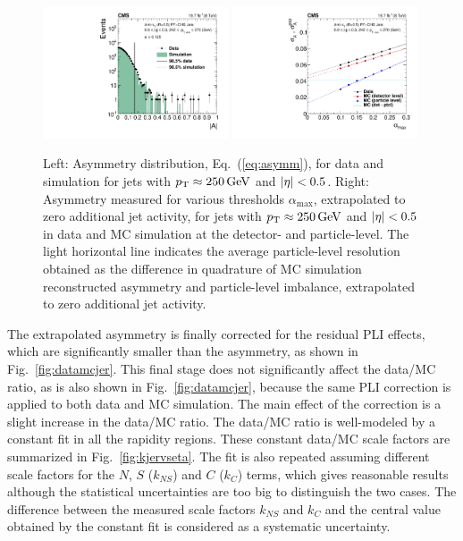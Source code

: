 \documentclass[11pt,twoside,a4paper,cmspaper,final,collab]{cms-tdr}
\begin{document}
\begin{figure}[htbp!]
\centering
\includegraphics[width=0.49\textwidth]{Figure_039-a.pdf}
\includegraphics[width=0.49\textwidth]{Figure_039-b.pdf}
\caption{\label{fig:asymm}
Left: Asymmetry distribution, Eq.~(\ref{eq:asymm}), for data and simulation for jets with $p_{\mathrm{T}} \approx 250\,\text{Ge\hspace{-.08em}V}$ and $\lvert \eta \rvert<0.5$.
Right: Asymmetry measured for various thresholds $\alpha_\text{max}$, extrapolated to zero additional jet activity, for jets with $p_{\mathrm{T}} \approx 250\,\text{Ge\hspace{-.08em}V}$ and $\lvert \eta \rvert<0.5$ in data and MC simulation at the detector- and particle-level. The light horizontal line indicates the average particle-level resolution obtained as the difference in quadrature of MC simulation reconstructed asymmetry and particle-level imbalance, extrapolated to zero additional jet activity.
}
\end{figure}

The extrapolated asymmetry is finally corrected for the residual PLI effects, which are significantly smaller than the asymmetry, as shown in Fig.~\ref{fig:datamcjer}. This final stage does not significantly affect the data/MC ratio, as is also shown in Fig.~\ref{fig:datamcjer}, because the same PLI correction is applied to both data and MC simulation. The main effect of the correction is a slight increase in the data/MC ratio.
The data/MC ratio is well-modeled by a constant fit in all the rapidity regions. These constant data/MC scale factors are summarized in Fig.~\ref{fig:kjervseta}. The fit is also repeated assuming different scale factors for the $N$, $S$ ($k_{NS}$) and $C$ ($k_{C}$) terms, which gives reasonable results although the statistical uncertainties are too big to distinguish the two cases. The difference between the measured scale factors $k_{NS}$ and $k_{C}$ and the central value obtained by the constant fit is considered as a systematic uncertainty.
\end{document}
